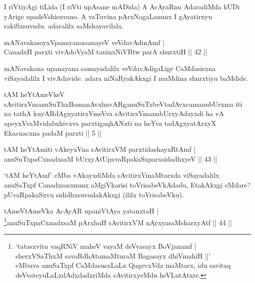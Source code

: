 \begin{artha} 
I riVtiyAgi tiLida (I riVti upAsane mADida) A AcAyaRnu AdaradiMda kUDi 
yArige upadeVshisuvano. A vaTuvina pArxNagaLanunx I gAyatirxyu 
rakiSxsuvadu. adaralilx saMshayavilalx.
\end{artha}


\begin{shl}
mANavakasoyxVpanayanasamayeV veVdavAdinAmf | \\
CanadxH parxti vivAdoV\s yaM taninxNiVRtw parA shurxtiH \hfill ||  42 || 
\end{shl}

\begin{artha} 
mANavakana upanayana samayadalilx veVdavAdigaLige CaMdasisxna 
viSayadalilx I vivAdavide. adara niNaRyakAkxgi I muMdina shurxtiyu 
baMdide.
\end{artha}

\begin{kandikeshl}
tAM heYtAmeVkeV sAvitirxVmanuSuThxBamanAvxhuvARganuSuTxbeVtadAvxcamanubUrxma iti na tathA kuyARdAgxyatirxVmeVva sAvitirxVmanubUrxyAdayxdi ha vA apeyxVvaMvidabxhivxva parxtigaqhANxti na heYva tadAgxyatArxyX Ekacnacxna padaM parxti || 5 ||
\end{kandikeshl}


\begin{shl}
tAM heYtAmiti vAkeyxVna sAvitirxVM parxtidashayxRtAmf | \\
anuSuTxpaCxnadxsaM bUrxyAtUpxvaRpakaSxparxsidadhxyeV \hfill ||  43 || 
\end{shl}

\begin{artha} 
`tAM heYtAmf' eMba vAkayxdiMda sAvitirxVmaMtarxda viSayadalilx 
anuSaTxpf Canadxsasxnunx aMgiVkarisi toVrisabeVkAdadu, EtakAkxgi eMdare? pUvaRpakaSxvu sididhxsuvudakAkxgi (ililx toVrisabeVku).
\end{artha}



\begin{shl}
tAmeVtAmeVka AcAyAR upaniVtAya yatanxtaH | \\
\footnote{`tatasxvitu vaqRNiV maheV vayaM deVvasayx BoVjanamf |\\
sherxVSaThxM savaRdhAtamaMturaM Bagasayx dhiVmahiH ||' \\ eMbuva anuSaTxpf CaMdasusxLaLx QugevxVda 
maMtarx, idu savitaq deVvateyuLaLxdAdxdadxriMda sAvitirxyeMdu 
heVLutAtxre.}anuSuTxpaCxnadxsaM pArxhuH sAvitirxVM nAyxyasaMsharxyAtf \hfill ||  44 || 
\end{shl}


